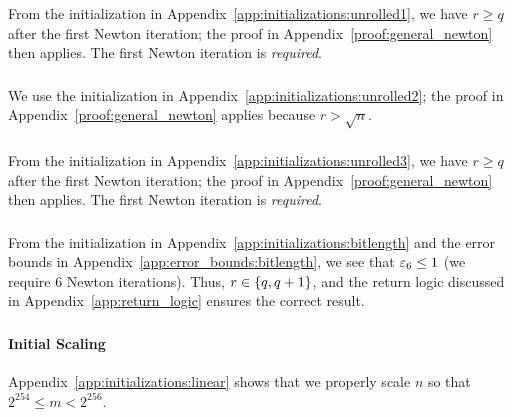 \subsubsection{\WhileOne{}}

From the initialization in Appendix~\ref{app:initializations:unrolled1},
we have $r\ge q$ after the first Newton iteration;
the proof in Appendix~\ref{proof:general_newton} then applies.
The first Newton iteration is \emph{required}.

\subsubsection{\WhileTwo{}}

We use the initialization in Appendix~\ref{app:initializations:unrolled2};
the proof in Appendix~\ref{proof:general_newton} applies
because $r > \sqrt{n}$.

\subsubsection{\WhileThree{}}

From the initialization in Appendix~\ref{app:initializations:unrolled3},
we have $r\ge q$ after the first Newton iteration;
the proof in Appendix~\ref{proof:general_newton} then applies.
The first Newton iteration is \emph{required}.

\subsubsection{\BitLength{}}
\label{app:conv_proof:bitlength}

From the initialization in Appendix~\ref{app:initializations:bitlength}
and the error bounds in Appendix~\ref{app:error_bounds:bitlength},
we see that $\varepsilon_{6}\le1$ (we require 6 Newton iterations).
Thus, $r\in\left\{ q,q+1 \right\}$, and the return logic
discussed in Appendix~\ref{app:return_logic} ensures the correct result.

\subsubsection{\Linear{}}
\label{app:conv_proof:linear}

\paragraph{Initial Scaling}
Appendix~\ref{app:initializations:linear}
shows that we properly scale $n$ so that $2^{254}\le m < 2^{256}$.

